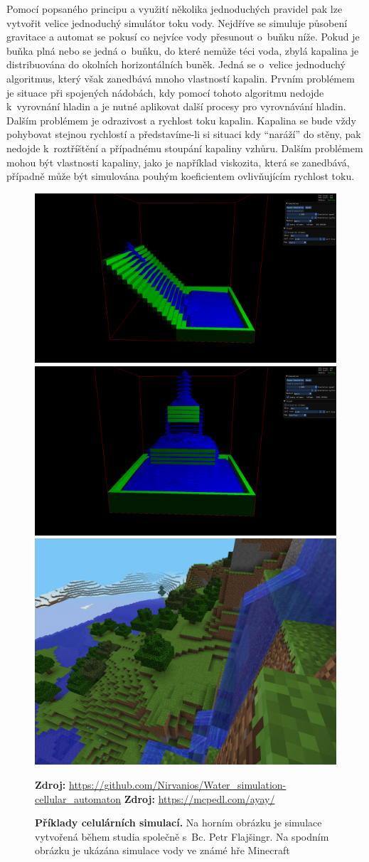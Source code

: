 Pomocí popsaného principu a využití několika jednoduchých pravidel pak lze vytvořit velice jednoduchý simulátor toku vody. Nejdříve se simuluje působení gravitace a automat se pokusí co nejvíce vody přesunout o~buňku níže. Pokud je buňka plná nebo se jedná o~buňku, do které nemůže téci voda, zbylá kapalina je distribuována do okolních horizontálních buněk. Jedná se o~velice jednoduchý algoritmus, který však zanedbává mnoho vlastností kapalin. Prvním problémem je situace při spojených nádobách, kdy pomocí tohoto algoritmu nedojde k~vyrovnání hladin a je nutné aplikovat další procesy pro vyrovnávání hladin. Dalším problémem je odrazivost a rychlost toku kapalin. Kapalina se bude vždy pohybovat stejnou rychlostí a představíme-li si situaci kdy \enquote{naráží} do stěny, pak nedojde k~roztříštění a případnému stoupání kapaliny vzhůru. Dalším problémem mohou být vlastnosti kapaliny, jako je například viskozita, která se zanedbává, případně může být simulována pouhým koeficientem ovlivňujícím rychlost toku. \cite{Medvecky-Heretik2018thesis}

\begin{figure}[h]\centering
  \centering
  \captionsetup{justification=centering}
	\includegraphics[width=0.5\linewidth]{obrazky-figures/cellular1.png}\hfill
	\includegraphics[width=0.5\linewidth]{obrazky-figures/cellular2.png}\hfill
	\includegraphics[width=0.5\linewidth]{obrazky-figures/miecraft.jpg}\hfill
  \caption{\textbf{Příklady celulárních simulací.} Na horním obrázku je simulace vytvořená během studia společně s~Bc. Petr Flajšingr. Na spodním obrázku je ukázána simulace vody ve známé hře Minecraft}
  \textbf{Zdroj: } \url{https://github.com/Nirvanios/Water_simulation-cellular_automaton}
  \textbf{Zdroj: } \url{https://mcpedl.com/ayay/}
  \label{fig:SWE}
\end{figure}

